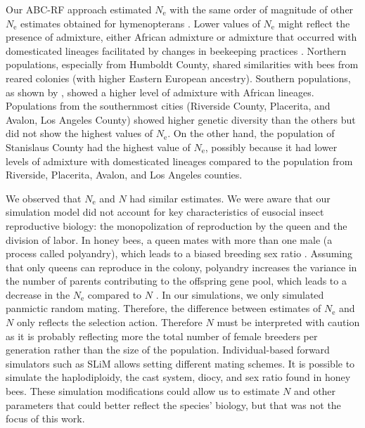 \documentclass[a4paper, 12pt]{article}
\begin{document}
Our ABC-RF approach estimated $N_\mathrm{e}$ with the same order of magnitude of other $N_\mathrm{e}$ estimates obtained for hymenopterans \citep{Zayed:2004kg}.
Lower values of $N_\mathrm{e}$ might reflect the presence of admixture, either African admixture or admixture that occurred with domesticated lineages facilitated by changes in beekeeping practices \citep{Cridland:2018fx}. Northern populations, especially from Humboldt County, shared similarities with bees from reared colonies (with higher Eastern European ancestry). Southern populations, as shown by \citet{Cridland:2018fx}, showed a higher level of admixture with African lineages. Populations from the southernmost cities (Riverside County, Placerita, and Avalon, Los Angeles County) showed higher genetic diversity than the others but did not show the highest values of $N_\mathrm{e}$. On the other hand, the population of Stanislaus County had the highest value of $N_\mathrm{e}$, possibly because it had lower levels of admixture with domesticated lineages compared to the population from Riverside, Placerita, Avalon, and Los Angeles counties.

We observed that $N_\mathrm{e}$ and $N$ had similar estimates. We were aware that our simulation model did not account for key characteristics of eusocial insect reproductive biology: the monopolization of reproduction by the queen and the division of labor. In honey bees, a queen mates with more than one male (a process called polyandry), which leads to a biased breeding sex ratio \citep{Estoup:jj}. Assuming that only queens can reproduce in the colony, polyandry increases the variance in the number of parents contributing to the offspring gene pool, which leads to a decrease in the $N_\mathrm{e}$ compared to $N$ \citep{Nomura:2012bp}. In our simulations, we only simulated panmictic random mating. Therefore, the difference between estimates of $N_\mathrm{e}$ and $N$ only reflects the selection action. Therefore $N$ must be interpreted with caution as it is probably reflecting more the total number of female breeders per generation rather than the size of the population. Individual-based forward simulators such as SLiM allows setting different mating schemes. It is possible to simulate the haplodiploidy, the cast system, diocy, and sex ratio found in honey bees. These simulation modifications could allow us to estimate $N$ and other parameters that could better reflect the species' biology, but that was not the focus of this work.
\end{document}
